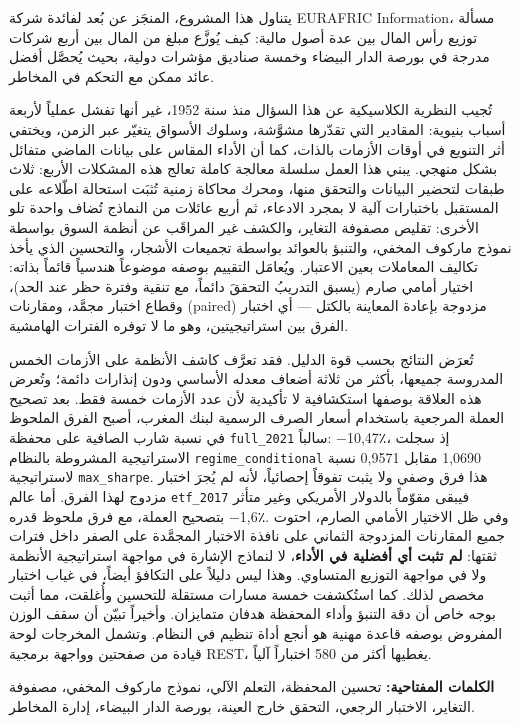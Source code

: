 \begin{Arabic}

يتناول هذا المشروع، المنجَز عن بُعد لفائدة شركة \textenglish{EURAFRIC Information}، مسألة
توزيع رأس المال بين عدة أصول مالية: كيف يُوزَّع مبلغ من المال بين أربع شركات
مدرجة في بورصة الدار البيضاء وخمسة صناديق مؤشرات دولية، بحيث يُحصَّل أفضل عائد
ممكن مع التحكم في المخاطر.

تُجيب النظرية الكلاسيكية عن هذا السؤال منذ سنة 1952، غير أنها تفشل عملياً لأربعة
أسباب بنيوية: المقادير التي تقدّرها مشوَّشة، وسلوك الأسواق يتغيّر عبر الزمن،
ويختفي أثر التنويع في أوقات الأزمات بالذات، كما أن الأداء المقاس على بيانات
الماضي متفائل بشكل منهجي. يبني هذا العمل سلسلة معالجة كاملة تعالج هذه المشكلات
الأربع: ثلاث طبقات لتحضير البيانات والتحقق منها، ومحرك محاكاة زمنية تُثبَت
استحالة اطّلاعه على المستقبل باختبارات آلية لا بمجرد الادعاء، ثم أربع عائلات من
النماذج تُضاف واحدة تلو الأخرى: تقليص مصفوفة التغاير، والكشف غير المراقَب عن
أنظمة السوق بواسطة نموذج ماركوف المخفي، والتنبؤ بالعوائد بواسطة تجميعات
الأشجار، والتحسين الذي يأخذ تكاليف المعاملات بعين الاعتبار. ويُعامَل التقييم
بوصفه موضوعاً هندسياً قائماً بذاته: اختيار أمامي صارم (يسبق التدريبُ التحققَ
دائماً، مع تنقية وفترة حظر عند الحد)، وقطاع اختبار مجمَّد، ومقارنات
\textenglish{(paired)} مزدوجة بإعادة المعاينة بالكتل — أي اختبار الفرق بين
استراتيجيتين، وهو ما لا توفره الفترات الهامشية.

تُعرَض النتائج بحسب قوة الدليل. فقد تعرَّف كاشف الأنظمة على الأزمات الخمس
المدروسة جميعها، بأكثر من ثلاثة أضعاف معدله الأساسي ودون إنذارات دائمة؛ وتُعرض
هذه العلاقة بوصفها استكشافية لا تأكيدية لأن عدد الأزمات خمسة فقط. %
بعد تصحيح العملة المرجعية باستخدام أسعار الصرف الرسمية لبنك المغرب، أصبح الفرق الملحوظ في نسبة شارب الصافية على محفظة \texttt{full\_2021} سالباً: ‎−10,47٪‎، إذ سجلت الاستراتيجية المشروطة بالنظام \texttt{regime\_conditional} نسبة ‎0,9571‎ مقابل ‎1,0690‎ لاستراتيجية \texttt{max\_sharpe}. هذا فرق وصفي ولا يثبت تفوقاً إحصائياً، لأنه لم يُجرَ اختبار مزدوج لهذا الفرق. أما عالم \texttt{etf\_2017} فيبقى مقوّماً بالدولار الأمريكي وغير متأثر بتصحيح العملة، مع فرق ملحوظ قدره ‎−1,6٪‎. وفي ظل الاختيار الأمامي
الصارم، احتوت جميع المقارنات المزدوجة الثماني على نافذة الاختبار المجمَّدة على
الصفر داخل فترات ثقتها: \textbf{لم تثبت أي أفضلية في الأداء}، لا لنماذج الإشارة
في مواجهة استراتيجية الأنظمة ولا في مواجهة التوزيع المتساوي. وهذا ليس دليلاً على
التكافؤ أيضاً، في غياب اختبار مخصص لذلك. كما استُكشفت خمسة مسارات مستقلة للتحسين
وأُغلقت، مما أثبت بوجه خاص أن دقة التنبؤ وأداء المحفظة هدفان متمايزان. وأخيراً
تبيّن أن سقف الوزن المفروض بوصفه قاعدة مهنية هو أنجع أداة تنظيم في النظام.
وتشمل المخرجات لوحة قيادة من صفحتين وواجهة برمجية \textenglish{REST}، يغطيها
أكثر من 580 اختباراً آلياً.

\vspace{0.6em}
\noindent\textbf{الكلمات المفتاحية:} تحسين المحفظة، التعلم الآلي، نموذج ماركوف
المخفي، مصفوفة التغاير، الاختبار الرجعي، التحقق خارج العينة، بورصة الدار
البيضاء، إدارة المخاطر.

\end{Arabic}
